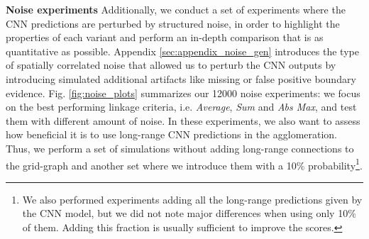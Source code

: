 

\textbf{Noise experiments }  Additionally, we conduct a set of experiments where the CNN predictions are perturbed by structured noise, in order to highlight the properties of each \algname{} variant and perform an in-depth comparison that is as quantitative as possible. Appendix \ref{sec:appendix_noise_gen} introduces the type of spatially correlated noise that allowed us to perturb the CNN outputs by introducing simulated additional artifacts like missing or false positive boundary evidence. 
Fig. \ref{fig:noise_plots} summarizes our 12000 noise experiments: we focus on the best performing linkage criteria, i.e. \emph{Average}, \emph{Sum} and \emph{Abs Max}, and test them with different amount of noise. 
In these experiments, we also want to assess how beneficial it is to use long-range CNN predictions in the agglomeration. Thus, we perform a set of simulations without adding long-range connections to the grid-graph and another set where we introduce them with a 10\% probability\footnote{We also performed experiments adding all the long-range predictions given by the CNN model, but we did not note major differences when using only 10\% of them. Adding this fraction is usually sufficient to improve the scores.}.

